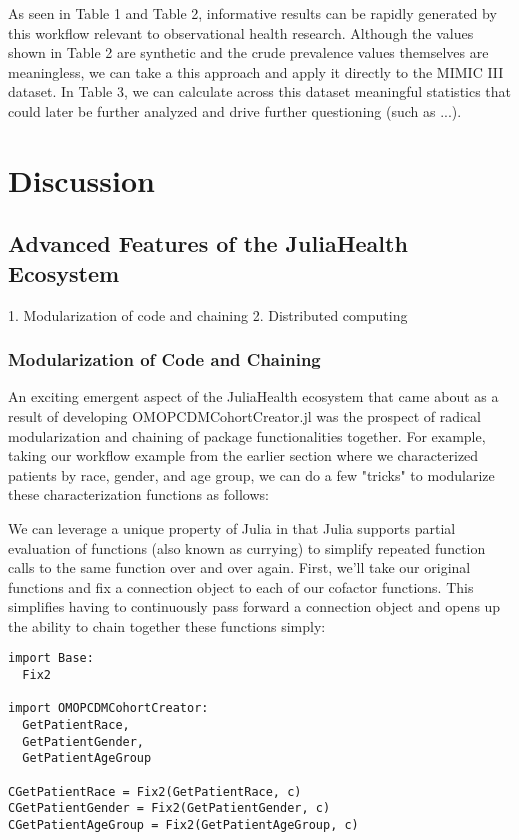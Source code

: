 \documentclass{juliacon}
\begin{document}
As seen in Table 1 and Table 2, informative results can be rapidly generated by this workflow relevant to observational health research.
Although the values shown in Table 2 are synthetic and the crude prevalence values themselves are meaningless, we can take a this approach and apply it directly to the MIMIC III dataset.
In Table 3, we can calculate across this dataset meaningful statistics that could later be further analyzed and drive further questioning (such as ...).

\section{Discussion}

\subsection{Advanced Features of the JuliaHealth Ecosystem}

    1. Modularization of code and chaining
    2. Distributed computing

\subsubsection{Modularization of Code and Chaining}

An exciting emergent aspect of the JuliaHealth ecosystem that came about as a result of developing OMOPCDMCohortCreator.jl was the prospect of radical modularization and chaining of package functionalities together.
For example, taking our workflow example from the earlier section where we characterized patients by race, gender, and age group, we can do a few "tricks" to modularize these characterization functions as follows:


We can leverage a unique property of Julia in that Julia supports partial evaluation of functions (also known as currying) to simplify repeated function calls to the same function over and over again.
First, we'll take our original functions and fix a connection object to each of our cofactor functions.
This simplifies having to continuously pass forward a connection object and opens up the ability to chain together these functions simply:

\begin{verbatim}
import Base:
  Fix2

import OMOPCDMCohortCreator:
  GetPatientRace,
  GetPatientGender,
  GetPatientAgeGroup

CGetPatientRace = Fix2(GetPatientRace, c)
CGetPatientGender = Fix2(GetPatientGender, c)
CGetPatientAgeGroup = Fix2(GetPatientAgeGroup, c)
\end{verbatim}
\end{document}
